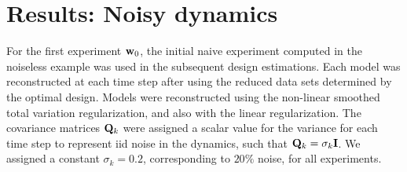 \documentclass[11pt]{article}
\begin{document}


\section{Results: Noisy  dynamics}
\label{sec: Example2}
For the first experiment ${\bf{w}}_0$, the initial naive experiment computed in the noiseless example was used in the subsequent design estimations. Each model was reconstructed at each time step after using the reduced data sets determined by the optimal design. Models were reconstructed using the non-linear smoothed total variation regularization, and also with the linear regularization. 
The covariance matrices ${\bf{Q}}_k$ were assigned a scalar value for the variance for each time step to represent iid noise in the dynamics, such that ${\bf{Q}}_k = \sigma_k {\bf{I}}$. We assigned a constant $\sigma_k = 0.2$, corresponding to $20\%$ noise, for all experiments.
\end{document}

